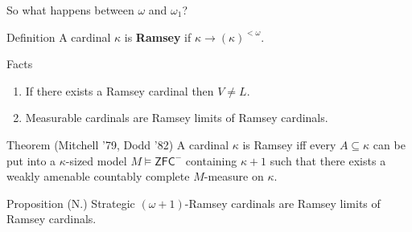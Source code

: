 \documentclass{beamer}
\begin{document}
\begin{frame}{So what happens between $\omega$ and $\omega_1$?}
  \begin{block}{Definition}
    A cardinal $\kappa$ is \textbf{Ramsey} if $\kappa\to(\kappa)^{<\omega}$.
  \end{block}
 
  \pause\begin{block}{Facts}
    \begin{enumerate}
      \item If there exists a Ramsey cardinal then $V\neq L$.
      \pause\item Measurable cardinals are Ramsey limits of Ramsey cardinals.
    \end{enumerate}
  \end{block}

  \pause\begin{block}{Theorem (Mitchell '79, Dodd '82)}
    A cardinal $\kappa$ is Ramsey iff every $A\subseteq\kappa$ can be put into a $\kappa$-sized model $M\models\textsf{ZFC}^-$ containing $\kappa{+}1$ such that there exists a weakly amenable countably complete $M$-measure on $\kappa$.
  \end{block}

\pause\begin{block}{Proposition (N.)}
    Strategic $(\omega{+}1)$-Ramsey cardinals are Ramsey limits of Ramsey cardinals.
  \end{block}
\end{frame}
\end{document}
